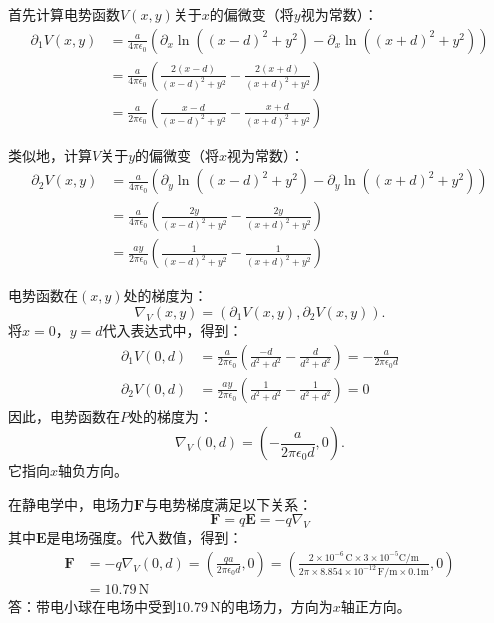 \documentclass[12pt,UTF8,fontset=none]{ctexbook}
\begin{document}
\begin{so}
首先计算电势函数$V(x,y)$关于$x$的偏微变（将$y$视为常数）：
\begin{align*}
\partial_1 V(x,y) &= \frac{a}{4\pi\epsilon_0} \left( \partial_x \ln{\left( (x-d)^2+y^2\right)} - \partial_x \ln{\left( (x+d)^2+y^2\right)} \right) \\
&= \frac{a}{4\pi\epsilon_0} \left( \frac{2(x-d)}{(x-d)^2+y^2} - \frac{2(x+d)}{(x+d)^2+y^2} \right) \\
&= \frac{a}{2\pi\epsilon_0} \left( \frac{x-d}{(x-d)^2+y^2} - \frac{x+d}{(x+d)^2+y^2} \right)
\end{align*}

类似地，计算$V$关于$y$的偏微变（将$x$视为常数）：
\begin{align*}
\partial_2 V(x,y) &= \frac{a}{4\pi\epsilon_0} \left( \partial_y \ln{\left( (x-d)^2+y^2\right)} - \partial_y \ln{\left( (x+d)^2+y^2\right)} \right) \\
&= \frac{a}{4\pi\epsilon_0} \left( \frac{2y}{(x-d)^2+y^2} - \frac{2y}{(x+d)^2+y^2} \right) \\
&= \frac{a y}{2\pi\epsilon_0} \left( \frac{1}{(x-d)^2+y^2} - \frac{1}{(x+d)^2+y^2} \right)
\end{align*}

电势函数在$(x,y)$处的梯度为：
$$ \nabla_V(x,y) = \left(\partial_1 V(x,y), \partial_2 V(x, y)\right).$$
将$x=0$，$y=d$代入表达式中，得到：
\begin{align*}
\partial_1 V(0,d) &= \frac{a}{2\pi\epsilon_0} \left( \frac{-d}{d^2+d^2} - \frac{d}{d^2+d^2} \right) = -\frac{a}{2\pi\epsilon_0 d} \\
\partial_2 V(0,d) &=\frac{a y}{2\pi\epsilon_0} \left( \frac{1}{d^2+d^2} - \frac{1}{d^2+d^2} \right) = 0
\end{align*}
因此，电势函数在$P$处的梯度为：
$$ \nabla_V(0,d) = \left( -\frac{a}{2\pi\epsilon_0 d}, 0 \right).$$
它指向$x$轴负方向。

在静电学中，电场力$\mathbf{F}$与电势梯度满足以下关系：
$$ \mathbf{F} = q\mathbf{E} = -q\nabla_V $$
其中$\mathbf{E}$是电场强度。代入数值，得到：
\begin{align*}
\mathbf{F} &= -q\nabla_V(0,d) = \left( \frac{qa}{2\pi\epsilon_0 d}, 0 \right) =\left( \frac{2\times10^{-6}\,\mathrm{C} \times 3\times10^{-5}\mathrm{C/m} }{2\pi\times 8.854\times10^{-12}\,\mathrm{F/m}\times 0.1\mathrm{m}}, 0 \right)\\
&= 10.79\,\mathrm{N}
\end{align*}
答：带电小球在电场中受到$10.79\,\mathrm{N}$的电场力，方向为$x$轴正方向。
\end{so}
\end{document}
